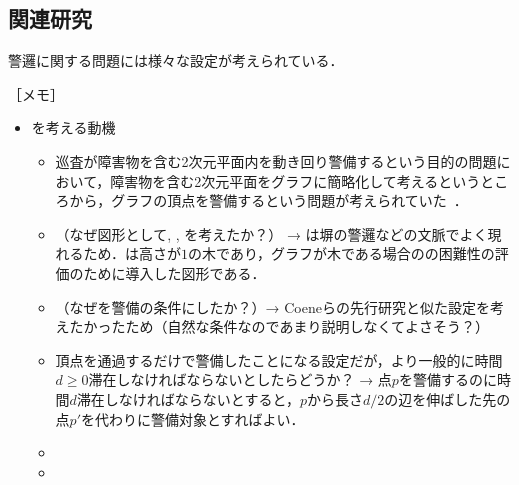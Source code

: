 \subsection*{関連研究}
警邏に関する問題には様々な設定が考えられている．

［メモ］
\begin{itemize}
  \item {\patProb}を考える動機
  \begin{itemize}
    \item 巡査が障害物を含む2次元平面内を動き回り警備するという目的の問題において，障害物を含む2次元平面をグラフに簡略化して考えるというところから，グラフの頂点を警備するという問題が考えられていた~\cite{machado2002multi}．
    \item （なぜ図形として{\graphLine}, {\graphStar}, {\graphUnit}を考えたか？） → {\graphLine}は塀の警邏などの文脈でよく現れるため．{\graphStar}は高さが$1$の木であり，グラフが木である場合の{\patProb}の困難性の評価のために導入した図形である．
    \item （なぜ{\maxIdletime}を警備の条件にしたか？）→ Coeneらの先行研究と似た設定を考えたかったため（自然な条件なのであまり説明しなくてよさそう？）
    \item 頂点を通過するだけで警備したことになる設定だが，より一般的に時間$d \geq 0$滞在しなければならないとしたらどうか？ → 点$p$を警備するのに時間$d$滞在しなければならないとすると，$p$から長さ$d/2$の辺を伸ばした先の点$p'$を代わりに警備対象とすればよい．
    \item 
    \item 
  \end{itemize}


\end{itemize}
